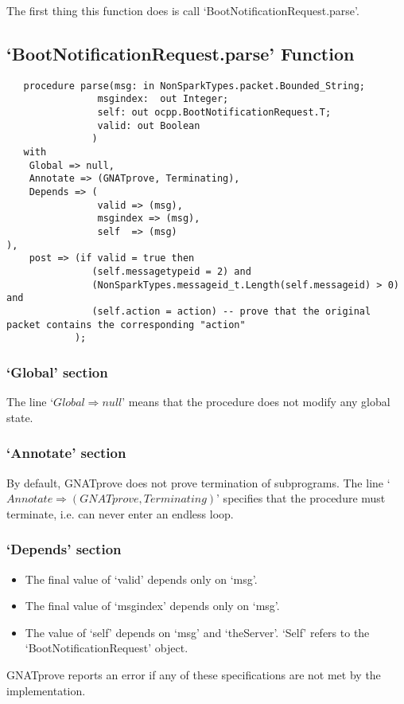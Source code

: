\documentclass[12pt,openany,a4paper]{book}
\begin{document}
The first thing this function does is call `BootNotificationRequest.parse'.


\subsection{`BootNotificationRequest.parse' Function}
\begin{verbatim}
   procedure parse(msg: in NonSparkTypes.packet.Bounded_String;
                msgindex:  out Integer;
                self: out ocpp.BootNotificationRequest.T;
                valid: out Boolean
               )
   with
    Global => null,
    Annotate => (GNATprove, Terminating),
    Depends => (
                valid => (msg),
                msgindex => (msg),
                self  => (msg)
),
    post => (if valid = true then
               (self.messagetypeid = 2) and
               (NonSparkTypes.messageid_t.Length(self.messageid) > 0) and
               (self.action = action) -- prove that the original packet contains the corresponding "action"
            );

\end{verbatim}
\subsubsection{`Global' section}
The line `$Global \Rightarrow null$' means that the procedure does not modify any global state.
\subsubsection{`Annotate' section}
By default, GNATprove does not prove termination of subprograms. The line `$Annotate \Rightarrow (GNATprove, Terminating)$' specifies that the procedure must terminate, i.e. can never enter an endless loop. 
\subsubsection{`Depends' section}
\begin{itemize}
\item The final value of `valid' depends only on `msg'.
\item The final value of `msgindex' depends only on `msg'.
\item The value of `self' depends on `msg' and `theServer'. `Self' refers to the `BootNotificationRequest' object.
\end{itemize}
GNATprove reports an error if any of these specifications are not met by the implementation.\\
\end{document}
